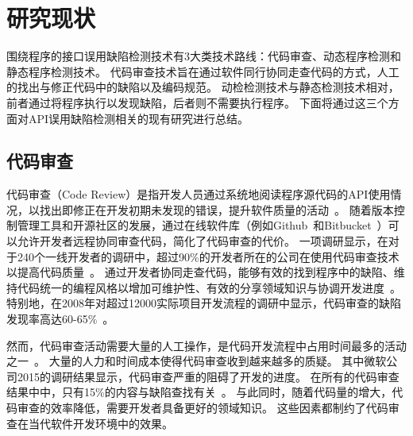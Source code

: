 



\section{研究现状}
围绕程序的接口误用缺陷检测技术有3大类技术路线：代码审查、动态程序检测和静态程序检测技术。
代码审查技术旨在通过软件同行协同走查代码的方式，人工的找出与修正代码中的缺陷以及编码规范。
动检检测技术与静态检测技术相对，前者通过将程序执行以发现缺陷，后者则不需要执行程序。
下面将通过这三个方面对API误用缺陷检测相关的现有研究进行总结。

\subsection{代码审查}
代码审查（Code Review）是指开发人员通过系统地阅读程序源代码的API使用情况，以找出即修正在开发初期未发现的错误，提升软件质量的活动~\cite{code-review}。
随着版本控制管理工具和开源社区的发展，通过在线软件库（例如Github~\cite{github}和Bitbucket~\cite{bitbucket}）可以允许开发者远程协同审查代码，简化了代码审查的代价。
一项调研显示，在对于240个一线开发者的调研中，超过90\%的开发者所在的公司在使用代码审查技术以提高代码质量~\cite{17-profes-code-review}。
通过开发者协同走查代码，能够有效的找到程序中的缺陷、维持代码统一的编程风格以增加可维护性、有效的分享领域知识与协调开发进度~\cite{13-icse-code-review}。
特别地，在2008年对超过12000实际项目开发流程的调研中显示，代码审查的缺陷发现率高达60-65\%~\cite{08-code-review}。

然而，代码审查活动需要大量的人工操作，是代码开发流程中占用时间最多的活动之一~\cite{13-esem-code-review}。
大量的人力和时间成本使得代码审查收到越来越多的质疑。
其中微软公司2015的调研结果显示，代码审查严重的阻碍了开发的进度。
在所有的代码审查结果中中，只有15\%的内容与缺陷查找有关~\cite{15-icse-code-review}。
与此同时，随着代码量的增大，代码审查的效率降低，需要开发者具备更好的领域知识。
这些因素都制约了代码审查在当代软件开发环境中的效果。


